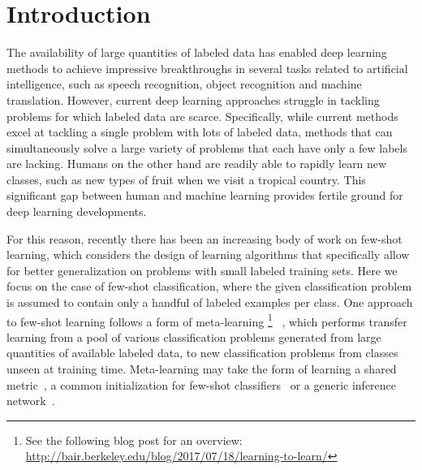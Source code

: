 \section{Introduction}

The availability of large quantities of labeled data has enabled deep learning methods to achieve
impressive breakthroughs in several tasks related to artificial intelligence, such as speech
recognition, object recognition and machine translation. However, current deep learning approaches
struggle in tackling problems for which labeled data are scarce. Specifically, while current methods
excel at tackling a single problem with lots of labeled data, methods that can simultaneously solve
a large variety of problems that each have only a few labels are lacking. Humans on the other hand
are readily able to rapidly learn new classes, such as new types of fruit when we visit a tropical
country. This significant gap between human and machine learning provides fertile ground for deep
learning developments.


For this reason, recently there has been an increasing body of work on few-shot learning, which
considers the design of learning algorithms that specifically allow for better generalization on
problems with small labeled training sets. Here we focus on the case of few-shot classification,
where the given classification problem is assumed to contain only a handful of labeled examples per
class. One approach to few-shot learning follows a form of meta-learning
\footnote{See the following blog post for an overview: 
\url{http://bair.berkeley.edu/blog/2017/07/18/learning-to-learn/}}
~\citep{Thrun1998, Hochreiter2001}, which performs transfer learning from a pool of various
classification problems generated from large quantities of available labeled data, to new
classification problems from classes unseen at training time. Meta-learning may take the form of
learning a shared metric~\citep{vinyals2016matchingnet,snell2017protonet}, a common initialization
for few-shot classifiers~\citep{ravi2017oneshot,FinnC2017} or a generic inference
network~\citep{Santoro2016,MishraN2017}.



